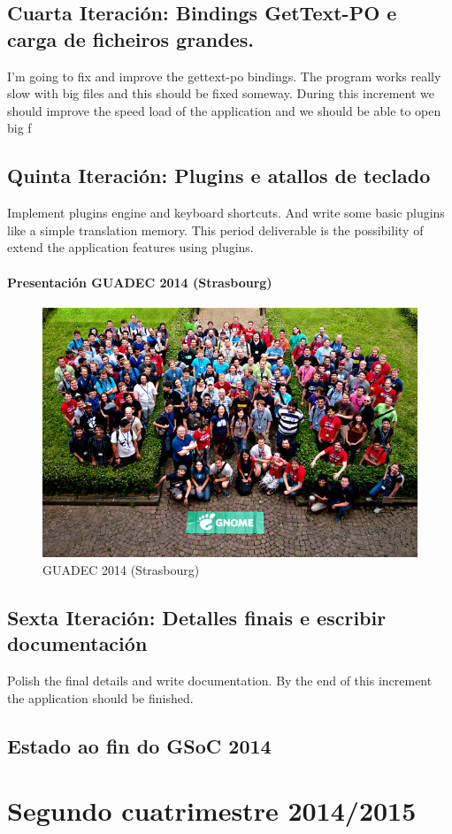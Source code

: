 \subsection{Cuarta Iteración: Bindings GetText-PO e carga de ficheiros grandes.} %

I’m going to fix and improve the gettext-po bindings. The program works really slow with big files and this should be fixed someway. During this increment we should improve the speed load of the application and we should be able to open big f

\subsection{Quinta Iteración: Plugins e atallos de teclado} %

Implement plugins engine and keyboard shortcuts. And write some basic plugins like a simple translation memory. This period deliverable is the possibility of extend the application features using plugins.

\paragraph{Presentación GUADEC 2014 (Strasbourg)}

\begin{figure}[h!]
    \centering
    \includegraphics[width=0.999\textwidth]{img/guadec_2014.jpg}
    \caption{GUADEC 2014 (Strasbourg)}
    \label{fig:guadec2012}
\end{figure}


\subsection{Sexta Iteración: Detalles finais e escribir documentación} %

Polish the final details and write documentation. By the end of this increment the application should be finished.


\subsection{Estado ao fin do GSoC 2014}

\section{Segundo cuatrimestre 2014/2015}
